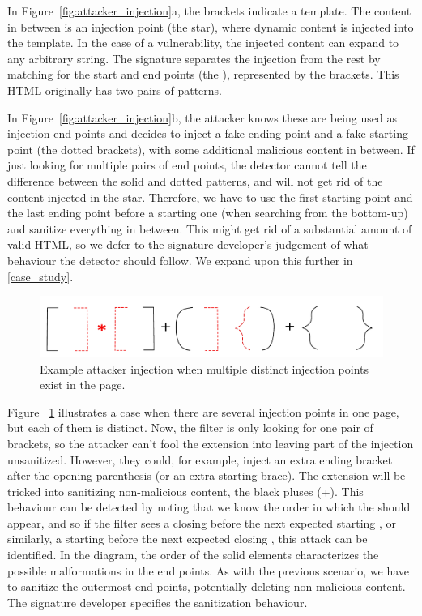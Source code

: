 In Figure~\ref{fig:attacker_injection}a, the brackets indicate a template. The content in between is an injection point (the star), where dynamic content is injected into the template. In the case of a vulnerability, the injected content can expand to any arbitrary string. The signature separates the injection from the rest by matching for the start and end points (the ), represented by the brackets. This HTML originally has two pairs of  patterns.

In Figure~\ref{fig:attacker_injection}b, the attacker knows these are being used as injection end points and decides to inject a fake ending point and a fake starting point (the dotted brackets), with some additional malicious content in between. If just looking for multiple pairs of end points, the detector cannot tell the difference between the solid and dotted patterns, and will not get rid of the content injected in the star. Therefore, we have to use the first starting point and the last ending point before a starting one (when searching from the bottom-up) and sanitize everything in between. This might get rid of a substantial amount of valid HTML, so we defer to the signature developer's judgement of what behaviour the detector should follow. We expand upon this further in \autoref{case_study}.


\begin{figure}[h]
	\includegraphics[scale=0.25]{img/attacker_injection_unique.pdf}
	\caption{Example attacker injection when multiple distinct injection points exist in the page.}
	\label{fig:attacker_injection_unique}
\end{figure}


Figure ~\ref{fig:attacker_injection_unique} illustrates a case when there are several injection points in one page, but each of them is distinct. Now, the filter is only looking for one pair of brackets, so the attacker can't fool the extension into leaving part of the injection unsanitized. However, they could, for example, inject an extra ending bracket after the opening parenthesis (or an extra starting brace). The extension will be tricked into sanitizing non-malicious content, the black pluses (+). This behaviour can be detected by noting that we know the order in which the  should appear, and so if the filter sees a closing  before the next expected starting , or similarly, a starting  before the next expected closing , this attack can be identified. In the diagram, the order of the solid elements characterizes the possible malformations in the end points. As with the previous scenario, we have to sanitize the outermost end points, potentially deleting non-malicious content. The signature developer specifies the sanitization behaviour.

